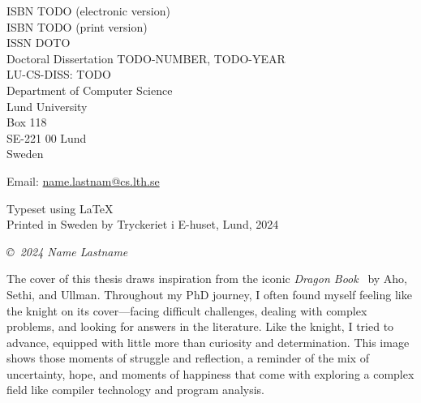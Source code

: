 \documentclass[a4paper, 10pt, twoside, openright]{book}
\begin{document}
\frontmatter

\begin{titlepage}

\thispagestyle{empty}


\begin{flushleft}

ISBN TODO (electronic version)\\
ISBN TODO (print version)\\
ISSN DOTO\\
Doctoral Dissertation TODO-NUMBER, TODO-YEAR\\
LU-CS-DISS: TODO\linebreak[2]\\

Department of Computer Science \\
Lund University \\
Box 118 \\
SE-221 00  Lund \\
Sweden  \linebreak[2]

Email: \url{name.lastnam@cs.lth.se} \linebreak[2]

Typeset using \LaTeX \\

Printed in Sweden by Tryckeriet i E-huset, Lund, 2024\linebreak[2]

\textit{\copyright ~2024 Name Lastname}
\vspace{10mm}
\end{flushleft}
\end{titlepage}




\thispagestyle{empty}

\begin{flushleft}

The cover of this thesis draws inspiration from the iconic \emph{Dragon Book}~\cite{aho2007compilers} by Aho,
Sethi, and Ullman. Throughout my PhD journey, I often found myself feeling like
the knight on its cover—facing difficult challenges, dealing with complex
problems, and looking for answers in the literature. Like the knight, I
tried to advance, equipped with little more than curiosity and
determination. This image shows those moments of struggle and reflection, a
reminder of the mix of uncertainty, hope, and moments of happiness that
come with exploring a complex field like compiler technology and program
analysis.


\vspace{10mm}
\end{flushleft}
\end{document}
